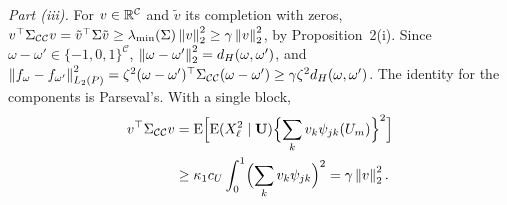 \emph{Part (iii).} For $v \in \mathbb{R}^{\mathcal{C}}$ and $\tilde v$ its completion
with zeros, $v^{\top}\Sigma_{\mathcal{C}\mathcal{C}}v = \tilde v^{\top}\Sigma\tilde v \ge
\lambda_{\min}(\Sigma)\left\lVert v \right\rVert_{2}^{2} \ge \gamma\left\lVert v \right\rVert_{2}^{2}$, by
Proposition~2(i). Since $\omega-\omega' \in \{-1,0,1\}^{\mathcal{C}}$,
$\left\lVert \omega-\omega' \right\rVert_{2}^{2} = d_{H}(\omega,\omega')$, and
$\left\lVert f_{\omega}-f_{\omega'} \right\rVert_{L_2(P)}^{2} =
\zeta^{2}(\omega-\omega')^{\top}\Sigma_{\mathcal{C}\mathcal{C}}(\omega-\omega') \ge
\gamma\zeta^{2}d_{H}(\omega,\omega')$. The identity for the components is
Parseval's. With a single block,
\begin{align*}
  v^{\top}\Sigma_{\mathcal{C}\mathcal{C}}v &=
  \mathrm{E}\Bigl[\mathrm{E}(X_{\ell}^{2}\mid\mathbf{U})\Bigl\{\sum_{k}v_{k}\psi_{jk}(U_{m})\Bigr\}^{2}\Bigr]
  \\
  &\ge \kappa_1c_U\int_0^1\Bigl(\sum_{k}v_{k}\psi_{jk}\Bigr)^{2} =
  \gamma\left\lVert v \right\rVert_{2}^{2} .
\end{align*}

